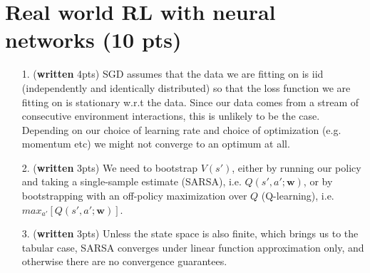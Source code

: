 \documentclass{article}
\begin{document}
\section{Real world RL with neural networks (10 pts)}
\begin{enumerate}
\item[1.] (\textbf{written} 4pts) SGD assumes that the data we are fitting on is iid (independently and identically distributed) so that the loss function we are fitting on is stationary w.r.t the data. Since our data comes from a stream of consecutive environment interactions, this is unlikely to be the case. Depending on our choice of learning rate and choice of optimization (e.g. momentum etc) we might not converge to an optimum at all.
\item[2.] (\textbf{written} 3pts) We need to bootstrap $V(s')$, either by running our policy and taking a single-sample estimate (SARSA), i.e. $Q(s',a';\textbf{w})$, or by bootstrapping with an off-policy maximization over $Q$ (Q-learning), i.e. $max_{a'}[Q(s',a';\textbf{w})]$.
\item[3.] (\textbf{written} 3pts) Unless the state space is also finite, which brings us to the tabular case, SARSA converges under linear function approximation only, and otherwise there are no convergence guarantees.
\end{enumerate}
\end{document}

